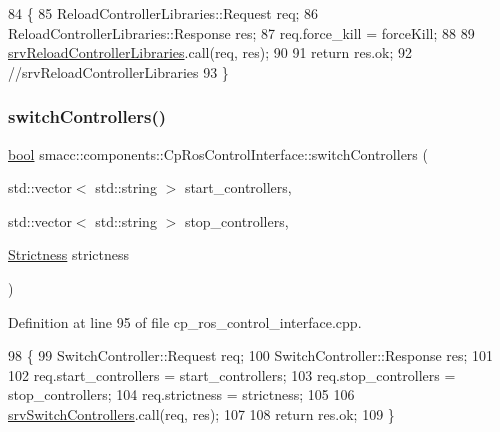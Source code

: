 \begin{DoxyCode}
84 \{
85     ReloadControllerLibraries::Request req;
86     ReloadControllerLibraries::Response res;
87     req.force\_kill = forceKill;
88 
89     \hyperlink{classsmacc_1_1components_1_1CpRosControlInterface_afdfece75d6aa438fae728e72add50e16}{srvReloadControllerLibraries}.call(req, res);
90 
91     \textcolor{keywordflow}{return} res.ok;
92     \textcolor{comment}{//srvReloadControllerLibraries}
93 \}
\end{DoxyCode}
\mbox{\label{classsmacc_1_1components_1_1CpRosControlInterface_a1cdb86924bbc0ab5f932d5504a943cbb}} 
\subsubsection{\texorpdfstring{switch\+Controllers()}{switchControllers()}}
{\footnotesize\ttfamily \hyperlink{classbool}{bool} smacc\+::components\+::\+Cp\+Ros\+Control\+Interface\+::switch\+Controllers (\begin{DoxyParamCaption}\item[{std\+::vector$<$ std\+::string $>$}]{start\+\_\+controllers,  }\item[{std\+::vector$<$ std\+::string $>$}]{stop\+\_\+controllers,  }\item[{\hyperlink{namespacesmacc_1_1components_a18117d6a71feb2471fb4e07f47674e4c}{Strictness}}]{strictness }\end{DoxyParamCaption})}



Definition at line 95 of file cp\+\_\+ros\+\_\+control\+\_\+interface.\+cpp.


\begin{DoxyCode}
98 \{
99     SwitchController::Request req;
100     SwitchController::Response res;
101 
102     req.start\_controllers = start\_controllers;
103     req.stop\_controllers = stop\_controllers;
104     req.strictness = strictness;
105 
106     \hyperlink{classsmacc_1_1components_1_1CpRosControlInterface_a78e45e68567c23ca5c19df0de257c20f}{srvSwitchControllers}.call(req, res);
107 
108     \textcolor{keywordflow}{return} res.ok;
109 \}
\end{DoxyCode}
\mbox{\label{classsmacc_1_1components_1_1CpRosControlInterface_a0c65acff40f36a15c67fab7c77ca23c8}} 

